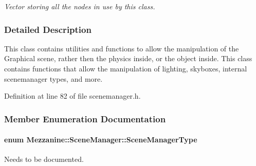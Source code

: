 \begin{DoxyCompactItemize}
\begin{DoxyCompactList}\small\item\em Vector storing all the nodes in use by this class. \item\end{DoxyCompactList}\end{DoxyCompactItemize}


\subsubsection{Detailed Description}
This class contains utilities and functions to allow the manipulation of the Graphical scene, rather then the physics inside, or the object inside. This class contains functions that allow the manipulation of lighting, skyboxes, internal scenemanager types, and more. 

Definition at line 82 of file scenemanager.h.



\subsubsection{Member Enumeration Documentation}
\hypertarget{classMezzanine_1_1SceneManager_ad6e20c08b97a230314abda3e5826f274}{
\paragraph[{SceneManagerType}]{\setlength{\rightskip}{0pt plus 5cm}enum {\bf Mezzanine::SceneManager::SceneManagerType}}\hfill}
\label{classMezzanine_1_1SceneManager_ad6e20c08b97a230314abda3e5826f274}


Needs to be documented. 

